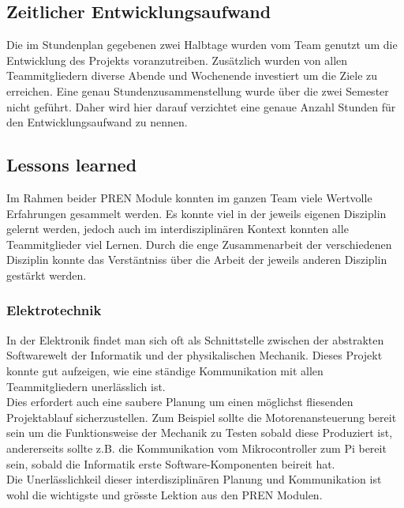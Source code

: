 \documentclass[../../main.tex]{subfiles}
\begin{document}
    \nocite{PiShopPi3ModelBp}
    \nocite{PiShopPiZero}
    \nocite{PiShopBrightPi}
    \nocite{PiShopPiKamera}
    \nocite{PlayZonePassiverBuzzer}
    \nocite{ReicheltStromPi}
    \nocite{ReicheltStromPiAkku}
    \nocite{AliExpressADXL345}
    \nocite{WisIBT2}
    \nocite{WishDCDCConverter}
    \nocite{AliExpressHCSR04}
    \nocite{AliExpressVL53L0X}
    \nocite{AliExpressLM2596}
    \nocite{Distrelec13FR200E}
    \nocite{AliExpress5V33VConverter}
    \nocite{WishTowerpro48}
    \nocite{WishTowerpro48}
    \nocite{MadlerZahnriemen}
    \nocite{MadlerZahnriemenrad}
    \nocite{MadlerKupplung}
    \nocite{MadlerZahnrad}


\pagebreak

\subsection{Zeitlicher Entwicklungsaufwand}
Die im Stundenplan gegebenen zwei Halbtage wurden vom Team genutzt um die Entwicklung des Projekts voranzutreiben. Zusätzlich wurden von allen Teammitgliedern diverse Abende und Wochenende investiert um die Ziele zu erreichen. Eine genau Stundenzusammenstellung wurde über die zwei Semester nicht geführt. Daher wird hier darauf verzichtet eine genaue Anzahl Stunden für den Entwicklungsaufwand zu nennen.\\

\subsection{Lessons learned}
Im Rahmen beider PREN Module konnten im ganzen Team viele Wertvolle Erfahrungen gesammelt werden. Es konnte viel in der jeweils eigenen Disziplin gelernt werden, jedoch auch im interdisziplinären Kontext konnten alle Teammitglieder viel Lernen. Durch die enge Zusammenarbeit der verschiedenen Disziplin konnte das Verstäntniss über die Arbeit der jeweils anderen Disziplin gestärkt werden.\\

\subsubsection{Elektrotechnik}
In der Elektronik findet man sich oft als Schnittstelle zwischen der abstrakten Softwarewelt der Informatik und der physikalischen Mechanik. Dieses Projekt konnte gut aufzeigen, wie eine ständige Kommunikation mit allen Teammitgliedern unerlässlich ist.\\
Dies erfordert auch eine saubere Planung um einen möglichst fliesenden Projektablauf sicherzustellen. Zum Beispiel sollte die Motorenansteuerung bereit sein um die Funktionsweise der Mechanik zu Testen sobald diese Produziert ist, andererseits sollte z.B. die Kommunikation vom Mikrocontroller zum Pi bereit sein, sobald die Informatik erste Software-Komponenten beireit hat.\\
Die Unerlässlichkeil dieser interdisziplinären Planung und Kommunikation ist wohl die wichtigste und grösste Lektion aus den PREN Modulen.
\end{document}
